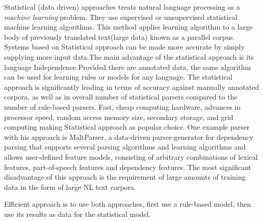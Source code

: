 \documentclass[sigconf]{acmart}
\begin{document}
   Statistical (data driven) approaches treats natural language processing as a \textit{machine learning} problem. They use supervised or unsupervised statistical machine learning algorithms. This method applies learning algorithm to a large body of previously translated text(large data) known as a parallel corpus. Systems based on Statistical approach can be made more accurate by simply supplying more input data.The main advantage of the statistical approach is its language Independence.Provided there are annotated data, the same algorithm can be used for learning rules or models for any language. The statistical approach is significantly  leading in terms of accuracy against manually annotated corpora, as well as in overall number of statistical parsers compared to the number of rule-based parsers. Fast, cheap computing hardware, advances in processor speed, random access memory size, secondary storage, and grid computing making Statistical approach as popular choice. One example parser with his approach is MaltParser, a data-driven parser-generator for dependency parsing  that  supports  several  parsing  algorithms  and  learning  algorithms and allows user-defined feature models, consisting of arbitrary combinations of lexical features, part-of-speech features and dependency features. The most significant disadvantage of this approach is the requirement of large amounts of training data in the form of large NL text corpora. 
\par\null\par
Efficient approach is to use both approaches, first use a rule-based model, then use its results as data for the statistical model. 
\end{document}
